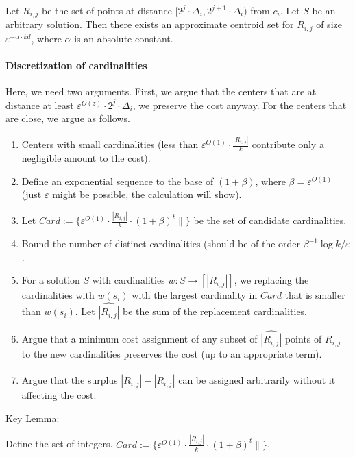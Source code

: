 \begin{lemma}
Let $R_{i,j}$ be the set of points at distance $[2^j\cdot \Delta_i,2^{j+1}\cdot \Delta_i)$ from $c_i$. Let $S$ be an arbitrary solution. Then there exists an approximate centroid set for $R_{i,j}$ of size $\varepsilon^{-\alpha\cdot kd}$, where $\alpha$ is an absolute constant.
\end{lemma}

\paragraph{Discretization of cardinalities}
Here, we need two arguments. First, we argue that the centers that are at distance at least $\varepsilon^{O(z)}\cdot 2^j\cdot \Delta_i$, we preserve the cost anyway.
For the centers that are close, we argue as follows. 
\begin{enumerate}
\item Centers with small cardinalities (less than $\varepsilon^{O(1)}\cdot \frac{|R_{i,j}|}{k}$ contribute only a negligible amount to the cost).
\item Define an exponential sequence to the base of $(1+\beta)$, where $\beta = \varepsilon^{O(1)}$ (just $\varepsilon$ might be possible, the calculation will show).
\item Let $Card:=\{\varepsilon^{O(1)}\cdot \frac{|R_{i,j}|}{k} \cdot (1+\beta)^t\|\}$ be the set of candidate cardinalities.
\item Bound the number of distinct cardinalities (should be of the order $\beta^{-1}\log k/\varepsilon$.
\item For a solution $S$ with cardinalities $w: S\rightarrow [|R_{i,j}|]$, we replacing the cardinalities with $w(s_i)$ with the largest cardinality in $Card$ that is smaller than $w(s_i)$. Let $\widehat{|R_{i,j}|}$ be the sum of the replacement cardinalities.
\item Argue that a minimum cost assignment of any subset of $\widehat{|R_{i,j}|}$ points of $R_{i,j}$ to the new cardinalities preserves the cost (up to an appropriate term).
\item Argue that the surplus $|R_{i,j}|-\widehat{|R_{i,j}|}$ can be assigned arbitrarily without it affecting the cost.
\end{enumerate}

Key Lemma:

Define the set of integers.
$Card:=\{\varepsilon^{O(1)}\cdot \frac{|R_{i,j}|}{k} \cdot (1+\beta)^t\|\}$.

